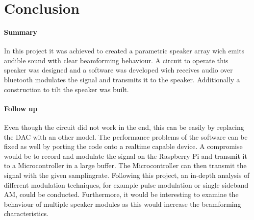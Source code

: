 \chapter{Conclusion}


\subsubsection*{Summary}

In this project it was achieved to created a parametric speaker array wich emits audible sound with clear beamforming behaviour. A circuit to operate this speaker was designed and a software was developed wich receives audio over bluetooth modulates the signal and transmits it to the speaker. Additionally a construction to tilt the speaker was built.
%
\subsubsection*{Follow up}
%
Even though the circuit did not work in the end, this can be easily by replacing the DAC with an other model. The performance problems of the software can be fixed as well by porting the code onto a realtime capable device. A compromise would be to record and modulate the signal on the Raspberry Pi and transmit it to a Microcontroller in a large buffer. The Microcontroller can then transmit the signal with the given samplingrate.\p
%
Following this project, an in-depth analysis of different modulation techniques, for example pulse modulation or single sideband AM, could be conducted. Furthermore, it would be interesting to examine the behaviour of multiple speaker modules as this would increase the beamforming characteristics.